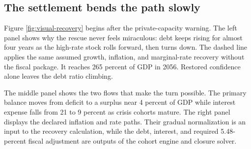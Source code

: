 \documentclass[11pt]{article}
\begin{document}
\FloatBarrier

\subsection*{The settlement bends the path slowly}

Figure \ref{fig:visual-recovery} begins after the private-capacity warning.  The left panel
shows why the rescue never feels miraculous: debt keeps rising for almost four years as the
high-rate stock rolls forward, then turns down.  The dashed line applies the same assumed
growth, inflation, and marginal-rate recovery without the fiscal package.  It reaches 265
percent of GDP in 2056.  Restored confidence alone leaves the debt ratio climbing.

The middle panel shows the two flows that make the turn possible.  The primary balance moves
from deficit to a surplus near 4 percent of GDP while interest expense falls from 21 to 9
percent as crisis cohorts mature.  The right panel displays the declared inflation and rate
paths.  Their gradual normalization is an input to the recovery calculation, while the debt,
interest, and required 5.48-percent fiscal adjustment are outputs of the cohort engine and
closure solver.
\end{document}
